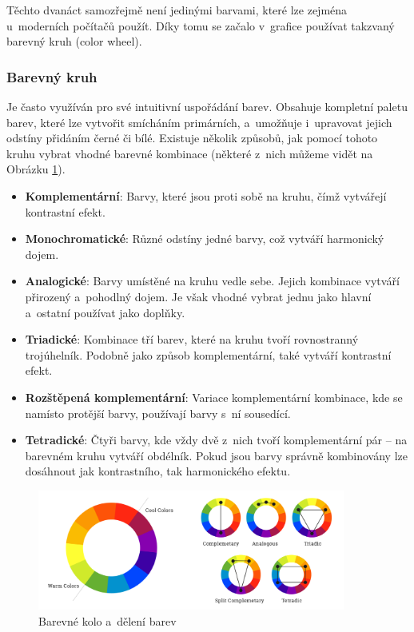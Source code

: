 Těchto dvanáct samozřejmě není jedinými barvami, které lze zejména u~moderních počítačů použít. Díky tomu se začalo v~grafice používat takzvaný barevný kruh (color wheel). \cite{color_theory_design}

\subsubsection*{Barevný kruh}
Je často využíván pro své intuitivní uspořádání barev. Obsahuje kompletní paletu barev, které lze vytvořit smícháním primárních, a~umožňuje i~upravovat jejich odstíny přidáním černé či bílé. Existuje několik způsobů, jak pomocí tohoto kruhu vybrat vhodné barevné kombinace (některé z~nich můžeme vidět na Obrázku \ref{fig:color_theory}). \cite{color_wheel,color_schemes}
\begin{itemize}
    \item \textbf{Komplementární}: Barvy, které jsou proti sobě na kruhu, čímž vytvářejí kontrastní efekt.
    \item \textbf{Monochromatické}: Různé odstíny jedné barvy, což vytváří harmonický dojem.
    \item \textbf{Analogické}: Barvy umístěné na kruhu vedle sebe. Jejich kombinace vytváří přirozený a~pohodlný dojem. Je však vhodné vybrat jednu jako hlavní a~ostatní používat jako doplňky.
    \item \textbf{Triadické}: Kombinace tří barev, které na kruhu tvoří rovnostranný trojúhelník. Podobně jako způsob komplementární, také vytváří kontrastní efekt.
    \item \textbf{Rozštěpená komplementární}: Variace komplementární kombinace, kde se namísto protější barvy, používají barvy s~ní sousedící. 
    \item \textbf{Tetradické}: Čtyři barvy, kde vždy dvě z~nich tvoří komplementární pár -- na barevném kruhu vytváří obdélník. Pokud jsou barvy správně kombinovány lze dosáhnout jak kontrastního, tak harmonického efektu.
\end{itemize}

\begin{figure}[H]
    \centering
    \includegraphics[width=0.9\textwidth]{resources/figures/color_theory.png}
    \caption{Barevné kolo a~dělení barev \cite{color_schemes}}
    \label{fig:color_theory}
\end{figure}

